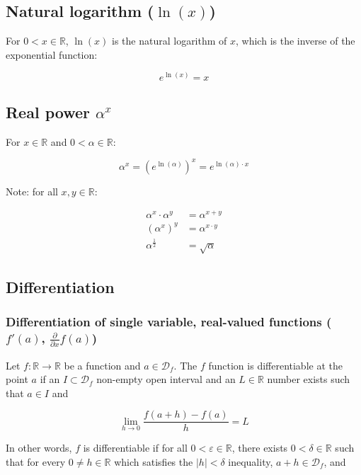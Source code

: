 \documentclass[titlepage]{article}
\begin{document}
      \subsection{Natural logarithm ($\ln(x)$)}

        For $0 < x \in \mathbb{R}$, $\ln(x)$ is the natural logarithm of $x$,
        which is the inverse of the exponential function:

        $$e^{\ln(x)} = x$$

      \subsection{Real power $\alpha^x$}

        For $x \in \mathbb{R}$ and $0 < \alpha \in \mathbb{R}$:

        $$
          \alpha^x = \left( e^{\ln(\alpha)} \right)^x = e^{\ln(\alpha) \cdot x}
        $$

        Note: for all $x, y \in \mathbb{R}$:

        \begin{align*}
          \alpha^x \cdot \alpha^y & = \alpha^{x+y} \\
          \left( \alpha^x \right)^y & = \alpha^{x \cdot y} \\
          \alpha^\frac{1}{2} & = \sqrt{\alpha}
        \end{align*}

      \subsection{Differentiation}

        \subsubsection{%
          Differentiation of single variable, real-valued functions
          ($f'(a)$, $\frac{\partial}{\partial x}f(a)$)
        }

          Let $f : \mathbb{R} \rightarrow \mathbb{R}$ be a function and
          $a \in \mathcal{D}_f$. The $f$ function is differentiable at the point
          $a$ if an $I \subset \mathcal{D}_f$ non-empty open interval and an
          $L \in \mathbb{R}$ number exists such that $a \in I$ and

          $$
            \lim_{h \to 0} \frac{f(a+h) - f(a)}{h} = L
          $$

          In other words, $f$ is differentiable if for all
          $0 < \varepsilon \in \mathbb{R}$, there exists
          $0 < \delta \in \mathbb{R}$ such that for every
          $0 \neq h \in \mathbb{R}$ which satisfies the $|h| < \delta$
          inequality, $a+h \in \mathcal{D}_f$, and
\end{document}

